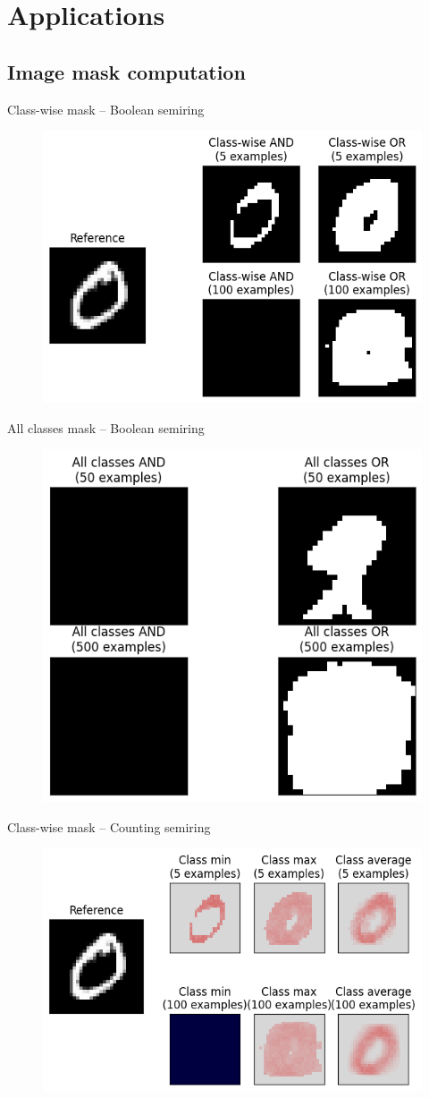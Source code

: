 \documentclass[aspectratio=169]{beamer}
\theoremstyle{definition}
\begin{document}
\section{Applications}
\subsection{Image mask computation}
\begin{frame}{Class-wise mask -- Boolean semiring}
    \begin{figure}
        \includegraphics[width=.65\textwidth]{boolean-mask.png}
    \end{figure}
\end{frame}

\begin{frame}{All classes mask -- Boolean semiring}
    \begin{figure}
        \includegraphics[width=.5\textwidth]{boolean-mask-all.png}
    \end{figure}
\end{frame}

\begin{frame}{Class-wise mask -- Counting semiring}
    \begin{figure}
        \includegraphics[width=.75\textwidth]{counting-mask.png}
    \end{figure}
\end{frame}
\end{document}
